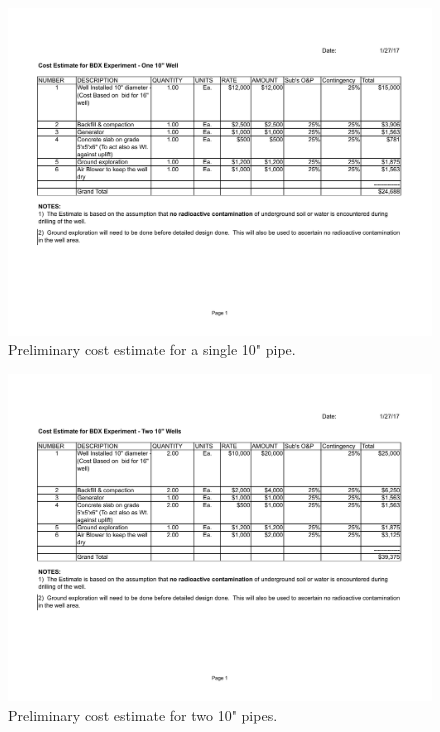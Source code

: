 \begin{figure}[thp] 
\center
\includegraphics[width=17cm,clip=true]{figs/Preliminary_Cost_Estimate_10_Inch_pipe.pdf}
\caption{Preliminary cost estimate for a single 10" pipe.}
\label{fig:Preliminary_Cost_Estimate_10_Inch_pipe}
\end{figure}

\begin{figure}[thp] 
\center
\includegraphics[width=17cm,clip=true]{figs/Preliminary_Cost_Estimate_for_two_10_Inch_pipes.pdf}
\caption{Preliminary cost estimate for two 10" pipes.}
\label{fig:Preliminary_Cost_Estimate_for_two_10_Inch_pipes}
\end{figure}


